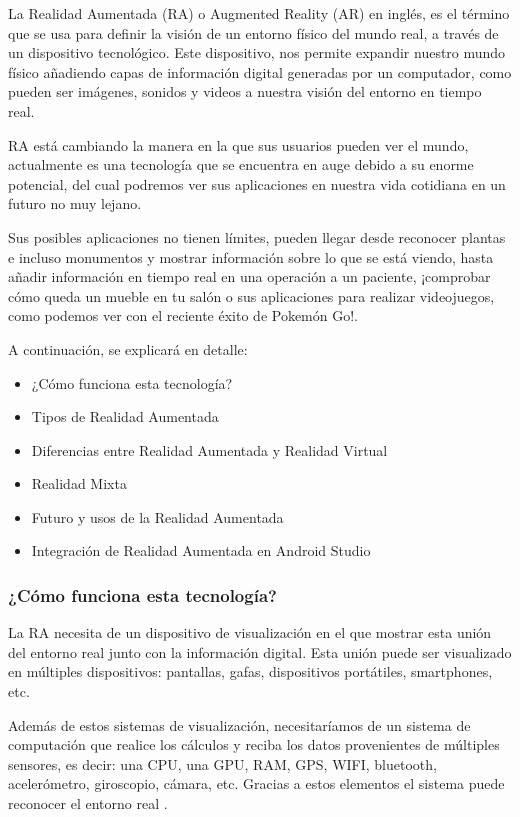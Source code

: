 La Realidad Aumentada (RA) o Augmented Reality (AR) en inglés, es el término que se usa para definir la visión de un entorno físico del mundo real, a través de un dispositivo tecnológico. Este dispositivo, nos permite expandir nuestro mundo físico añadiendo capas de información digital generadas por un computador, como pueden ser imágenes, sonidos y videos a nuestra visión del entorno en tiempo real. 

RA está cambiando la manera en la que sus usuarios pueden ver el mundo, actualmente es una tecnología que se encuentra en auge debido a su enorme potencial, del cual podremos ver sus aplicaciones en nuestra vida cotidiana en un futuro no muy lejano. 

Sus posibles aplicaciones no tienen límites, pueden llegar desde reconocer plantas e incluso monumentos y mostrar información sobre lo que se está viendo, hasta añadir información en tiempo real en una operación a un paciente, ¡comprobar cómo queda un mueble en tu salón o sus aplicaciones para realizar videojuegos, como podemos ver con el reciente éxito de Pokemón Go!. 

A continuación, se explicará en detalle:
\begin{itemize}
\item ¿Cómo funciona esta tecnología?
\item Tipos de Realidad Aumentada
\item Diferencias entre Realidad Aumentada y Realidad Virtual
\item Realidad Mixta
\item Futuro y usos de la Realidad Aumentada
\item Integración de Realidad Aumentada en Android Studio
\end{itemize}  

\subsubsection{¿Cómo funciona esta tecnología?}
La RA necesita de un dispositivo de visualización en el que mostrar esta unión del entorno real junto con la información digital. Esta unión puede ser visualizado en múltiples dispositivos: pantallas, gafas, dispositivos portátiles, smartphones, etc.
 
Además de estos sistemas de visualización, necesitaríamos de un sistema de computación que realice los cálculos y reciba los datos provenientes de múltiples sensores, es decir: una CPU, una GPU, RAM, GPS, WIFI, bluetooth, acelerómetro, giroscopio, cámara, etc. Gracias a estos elementos el sistema puede reconocer el entorno real  \cite{URL::ImageRegister}.

